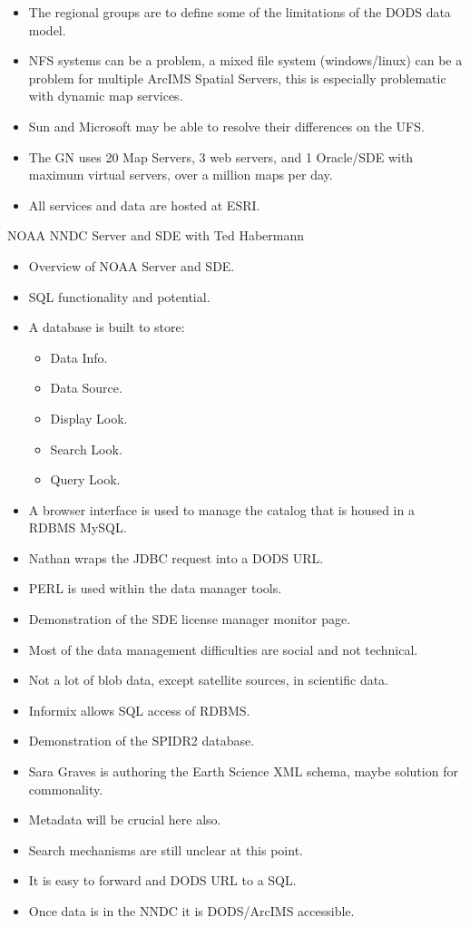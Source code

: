 \begin{itemize}
\item The regional groups are to define some of the limitations of the DODS data model.
\item NFS systems can be a problem, a mixed file system (windows/linux) can be a problem 
for multiple ArcIMS Spatial Servers, this is especially problematic with dynamic map 
services.
\item Sun and Microsoft may be able to resolve their differences on the UFS.
\item The GN uses 20 Map Servers, 3 web servers, and 1 Oracle/SDE with maximum virtual 
servers, over a million maps per day.
\item All services and data are hosted at ESRI.
\end{itemize}


NOAA NNDC Server and SDE with Ted Habermann

\begin{itemize}
\item Overview of NOAA Server and SDE.
\item SQL functionality and potential.
\item A database is built to store:
\begin{itemize}
\item Data Info.
\item Data Source.
\item Display Look.
\item Search Look.
\item Query Look.
\end{itemize}
\item A browser interface is used to manage the catalog that is housed in a RDBMS MySQL.
\item Nathan wraps the JDBC request into a DODS URL.
\item PERL is used within the data manager tools.
\item Demonstration of the SDE license manager monitor page.
\item Most of the data management difficulties are social and not technical.
\item Not a lot of blob data, except satellite sources, in scientific data.
\item Informix allows SQL access of RDBMS.
\item Demonstration of the SPIDR2 database.
\item Sara Graves is authoring the Earth Science XML schema, maybe solution for 
commonality.
\item Metadata will be crucial here also.
\item Search mechanisms are still unclear at this point.
\item It is easy to forward and DODS URL to a SQL.
\item Once data is in the NNDC it is DODS/ArcIMS accessible.
\end{itemize}


